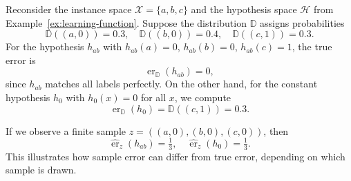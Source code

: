 \begin{example}
    Reconsider the instance space $\mathcal{X}=\{a,b,c\}$ and the hypothesis space $\mathcal{H}$ from Example~\ref{ex:learning-function}.
    Suppose the distribution $\mathbb{D}$ assigns probabilities
    \[
        \mathbb{D}((a,0))=0.3,\quad \mathbb{D}((b,0))=0.4,\quad \mathbb{D}((c,1))=0.3.
    \]
    For the hypothesis $h_{ab}$ with $h_{ab}(a)=0$, $h_{ab}(b)=0$, $h_{ab}(c)=1$, the true error is
    \[
        \operatorname{er}_{\mathbb{D}}(h_{ab}) = 0,
    \]
    since $h_{ab}$ matches all labels perfectly.
    On the other hand, for the constant hypothesis $h_0$ with $h_0(x)=0$ for all $x$, we compute
    \[
        \operatorname{er}_{\mathbb{D}}(h_0) = \mathbb{D}((c,1)) = 0.3.
    \]

    If we observe a finite sample $z=((a,0),(b,0),(c,0))$, then
    \[
        \hat{\operatorname{er}}_z(h_{ab}) = \tfrac{1}{3}, \quad
        \hat{\operatorname{er}}_z(h_{0}) = \tfrac{1}{3}.
    \]
    This illustrates how sample error can differ from true error, depending on which sample is drawn.
\end{example}





